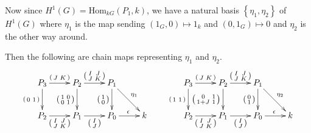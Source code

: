 \documentclass[12pt]{article}
\begin{document}
Now since $H^1\left(G\right)=\mathrm{Hom}_{kG}\left(P_1,k\right)$,
we have a natural basis 
$\left\{\eta_1,\eta_2\right\}$ of $H^1\left(G\right)$
where $\eta_1$ is the map sending $\left(1_G,0\right)\mapsto 1_k$
and $\left(0,1_G\right)\mapsto 0$ and $\eta_2$ is the other way
around. 

Then the following are chain maps representing $\eta_1$ and $\eta_2$.
\begin{equation}\label{eta12}
\begin{xy}\xymatrix{
P_3\ar[r]^{\left(\begin{smallmatrix}J&K\end{smallmatrix}\right)}
\ar[d]_{\left(\begin{smallmatrix}0&1\end{smallmatrix}\right)}
&P_2\ar[r]^{\left(\begin{smallmatrix}I&J\\J&K\end{smallmatrix}\right)}
\ar[d]_{\left(\begin{smallmatrix}1&0\\0&1\end{smallmatrix}\right)}
&P_1\ar[rd]^{\eta_1}
\ar[d]_{\left(\begin{smallmatrix}1\\0\end{smallmatrix}\right)}\\
P_2\ar[r]_{\left(\begin{smallmatrix}I&J\\J&K\end{smallmatrix}\right)}
&P_1\ar[r]_{\left(\begin{smallmatrix}I\\J\end{smallmatrix}\right)}
&P_0\ar[r]^\epsilon
&k
}\end{xy}\qquad
\begin{xy}\xymatrix{
P_3\ar[r]^{\left(\begin{smallmatrix}J&K\end{smallmatrix}\right)}
\ar[d]_{\left(\begin{smallmatrix}1&1\end{smallmatrix}\right)}
&P_2\ar[r]^{\left(\begin{smallmatrix}I&J\\J&K\end{smallmatrix}\right)}
\ar[d]_{\left(\begin{smallmatrix}0&1\\1+J&1\end{smallmatrix}\right)}
&P_1\ar[rd]^{\eta_2}
\ar[d]_{\left(\begin{smallmatrix}0\\1\end{smallmatrix}\right)}\\
P_2\ar[r]_{\left(\begin{smallmatrix}I&J\\J&K\end{smallmatrix}\right)}
&P_1\ar[r]_{\left(\begin{smallmatrix}I\\J\end{smallmatrix}\right)}
&P_0\ar[r]^\epsilon
&k
}\end{xy}
\end{equation}
\end{document}
